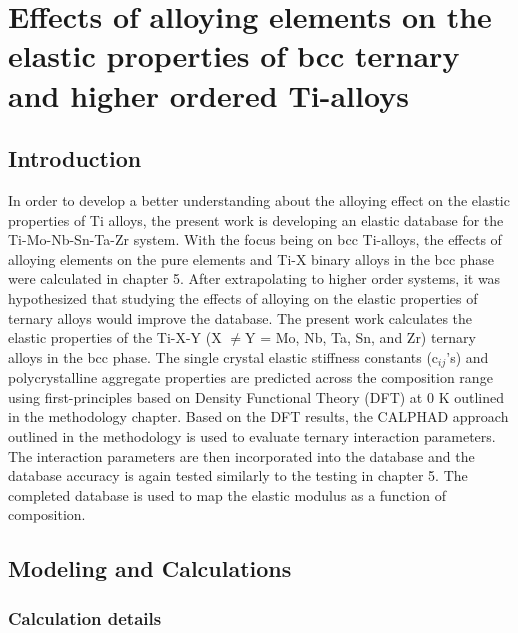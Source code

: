 \chapter{Effects of alloying elements on the elastic properties of bcc ternary and higher ordered Ti-alloys}

\section{Introduction}

In order to develop a better understanding about the alloying effect on the elastic properties of Ti alloys, the present work is developing an elastic database for the Ti-Mo-Nb-Sn-Ta-Zr system. With the focus being on bcc Ti-alloys, the effects of alloying elements on the pure elements and Ti-X binary alloys in the bcc phase were calculated in chapter 5. After extrapolating to higher order systems, it was hypothesized that studying the effects of alloying on the elastic properties of ternary alloys would improve the database. The present work calculates the elastic properties of the Ti-X-Y (X $\neq$Y = Mo, Nb, Ta, Sn, and Zr) ternary alloys in the bcc phase. The single crystal elastic stiffness constants (c$_{ij}$'s) and polycrystalline aggregate properties are predicted across the composition range using first-principles based on Density Functional Theory (DFT) at 0 K outlined in the methodology chapter. Based on the DFT results, the CALPHAD approach outlined in the methodology is used to evaluate ternary interaction parameters. The interaction parameters are then incorporated into the database and the database accuracy is again tested similarly to the testing in chapter 5. The completed database is used to map the elastic modulus as a function of composition.

\section{Modeling and Calculations}

\subsection{Calculation details}

